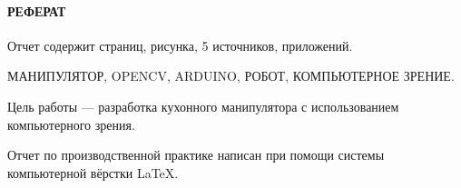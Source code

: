 \newpage
\paragraph{\hfill РЕФЕРАТ \hfill}
Отчет содержит  страниц,  рисунка, 5 источников,  приложений.

МАНИПУЛЯТОР, OPENCV, ARDUINO, РОБОТ, КОМПЬЮТЕРНОЕ ЗРЕНИЕ.

Цель работы --- разработка кухонного манипулятора с использованием компьютерного зрения.

Отчет по производственной практике написан при помощи системы компьютерной вёрстки \LaTeX.
